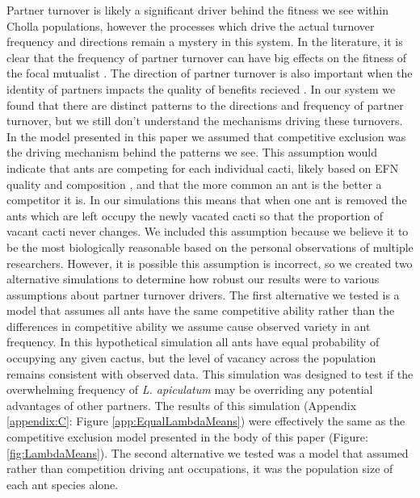 \documentclass[11pt]{article}
\begin{document}
Partner turnover is likely a significant driver behind the fitness we see within Cholla populations, however the processes which drive the actual turnover frequency and directions remain a mystery in this system.
In the literature, it is clear that the frequency of partner turnover can have big effects on the fitness of the focal mutualist \cite{Fiala1994, Horvitz1986, Oliveira1999, Sachs2004}.
The direction of partner turnover is also important when the identity of partners impacts the quality of benefits recieved \cite{Fonseca2003, Alonso1998, Dejean2008, Noe1994}.
In our system we found that there are distinct patterns to the directions and frequency of partner turnover, but we still don't understand the mechanisms driving these turnovers.
In the model presented in this paper we assumed that competitive exclusion was the driving mechanism behind the patterns we see.
This assumption would indicate that ants are competing for each individual cacti, likely based on EFN quality and composition \citep{Heil2004,Heil2010}, and that the more common an ant is the better a competitor it is.
In our simulations this means that when one ant is removed the ants which are left occupy the newly vacated cacti so that the proportion of vacant cacti never changes.
We included this assumption because we believe it to be the most biologically reasonable based on the personal observations of multiple researchers.
However, it is possible this assumption is incorrect, so we created two alternative simulations to determine how robust our results were to various assumptions about partner turnover drivers.
The first alternative we tested is a model that assumes all ants have the same competitive ability rather than the differences in competitive ability we assume cause observed variety in ant frequency.
In this hypothetical simulation all ants have equal probability of occupying any given cactus, but the level of vacancy across the population remains consistent with observed data.
This simulation was designed to test if the overwhelming frequency of \textit{L. apiculatum} may be overriding any potential advantages of other partners.
The results of this simulation (Appendix \ref{appendix:C}: Figure \ref{app:EqualLambdaMeans}) were effectively the same as the competitive exclusion model presented in the body of this paper (Figure: \ref{fig:LambdaMeans}).
The second alternative we tested was a model that assumed rather than competition driving ant occupations, it was the population size of each ant species alone.
\end{document}
